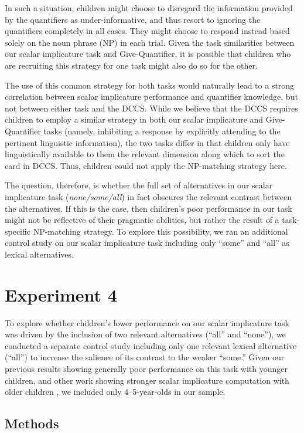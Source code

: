 \documentclass[man]{apa2}
\begin{document}
{In such a situation, children might choose to disregard the information provided by the quantifiers as under-informative, and thus resort to ignoring the quantifiers completely in all cases. They might choose to respond instead based solely on the noun phrase (NP) in each trial. Given the task similarities between our scalar implicature task and Give-Quantifier, it is possible that children who are recruiting this strategy for one task might also do so for the other.

The use of this common strategy for both tasks would naturally lead to a strong correlation between scalar implicature performance and quantifier knowledge, but not between either task and the DCCS. While we believe that the DCCS requires children to employ a similar strategy in both our scalar implicature and Give-Quantifier tasks (namely, inhibiting a response by explicitly attending to the pertinent linguistic information), the two tasks differ in that children only have linguistically available to them the relevant dimension along which to sort the card in DCCS. Thus, children could not apply the NP-matching strategy here.

The question, therefore, is whether the full set of alternatives in our scalar implicature task (\emph{none/some/all}) in fact obscures the relevant contrast between the alternatives. If this is the case, then children's poor performance in our task might not be reflective of their pragmatic abilities, but rather the result of a task-specific NP-matching strategy. To explore this possibility, we ran an additional control study on our scalar implicature task including only ``some'' and ``all'' as lexical alternatives.

\section{Experiment 4}

To explore whether children's lower performance on our scalar implicature task was driven by the inclusion of two relevant alternatives (``all'' and ``none''), we conducted a separate control study including only one relevant lexical alternative (``all'') to increase the salience of its contrast to the weaker ``some.'' Given our previous results showing generally poor performance on this task with younger children, and other work showing stronger scalar implicature computation with older children \cite{skordos2014,skordos2016}, we included only 4--5-year-olds in our sample.

\subsection{Methods}

}
\end{document}
